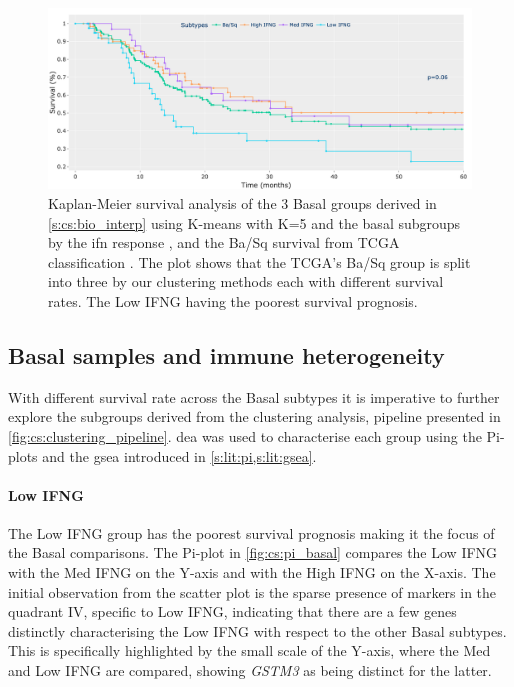 \begin{figure}[!htb]    
    \centering
    \includegraphics[width=1.0\textwidth,keepaspectratio]{Sections/ClusteringAnalysis/Resources/discussion/survival_basal.png}
    \centering
    \caption[New Basal subgroups and their survival prognosis]{Kaplan-Meier survival analysis of the 3 Basal groups derived in \cref{s:cs:bio_interp} using K-means with K=5 and the basal subgroups by the \acrshort{ifn} response \citet{Baker2022-bj}, and the Ba/Sq survival from TCGA classification \citet{Robertson2017-mg}. The plot shows that the TCGA's Ba/Sq group is split into three by our clustering methods each with different survival rates. The Low IFNG having the poorest survival prognosis.}
    \label{fig:cs:basal_survival}
\end{figure}

\subsection{Basal samples and immune heterogeneity} \label{s:cs:basal_interp}

With different survival rate across the Basal subtypes it is imperative to further explore the subgroups derived from the clustering analysis, pipeline presented in \cref{fig:cs:clustering_pipeline}. \acrfull{dea} was used to characterise each group using the Pi-plots and the \acrfull{gsea} introduced in \cref{s:lit:pi,s:lit:gsea}. 

\paragraph*{Low IFNG}

The Low IFNG group has the poorest survival prognosis making it the focus of the Basal comparisons. The Pi-plot in \cref{fig:cs:pi_basal} compares the Low IFNG with the Med IFNG on the Y-axis and with the High IFNG on the X-axis. The initial observation from the scatter plot is the sparse presence of markers in the quadrant IV, specific to Low IFNG, indicating that there are a few genes distinctly characterising the Low IFNG with respect to the other Basal subtypes. This is specifically highlighted by the small scale of the Y-axis, where the Med and Low IFNG are compared, showing \textit{GSTM3} as being distinct for the latter.

